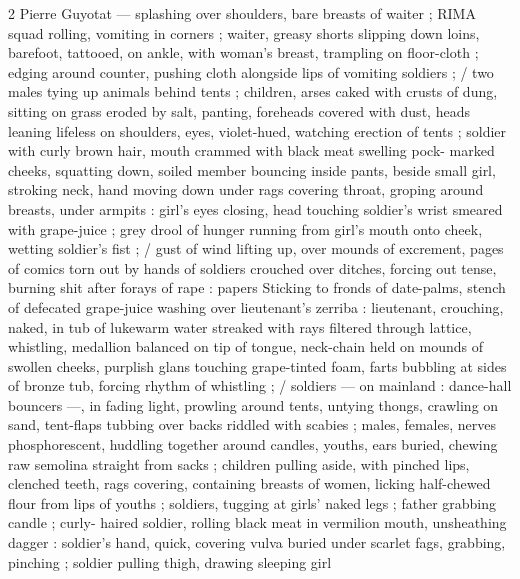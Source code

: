 2 Pierre Guyotat
— splashing over shoulders, bare breasts of waiter ; RIMA squad
rolling, vomiting in corners ; waiter, greasy shorts slipping down
loins, barefoot, tattooed, on ankle, with woman's breast, trampling
on floor-cloth ; edging around counter, pushing cloth alongside lips
of vomiting soldiers ; / two males tying up animals behind tents ;
children, arses caked with crusts of dung, sitting on grass eroded by
salt, panting, foreheads covered with dust, heads leaning lifeless on
shoulders, eyes, violet-hued, watching erection of tents ; soldier with
curly brown hair, mouth crammed with black meat swelling pock-
marked cheeks, squatting down, soiled member bouncing inside
pants, beside small girl, stroking neck, hand moving down under rags
covering throat, groping around breasts, under armpits : girl’s eyes
closing, head touching soldier's wrist smeared with grape-juice ; grey
drool of hunger running from girl's mouth onto cheek, wetting
soldier's fist ; / gust of wind lifting up, over mounds of excrement,
pages of comics torn out by hands of soldiers crouched over ditches,
forcing out tense, burning shit after forays of rape : papers Sticking
to fronds of date-palms, stench of defecated grape-juice washing
over lieutenant's zerriba : lieutenant, crouching, naked, in tub of
lukewarm water streaked with rays filtered through lattice, whistling,
medallion balanced on tip of tongue, neck-chain held on mounds of
swollen cheeks, purplish glans touching grape-tinted foam, farts
bubbling at sides of bronze tub, forcing rhythm of whistling ; /
soldiers — on mainland : dance-hall bouncers —, in fading light,
prowling around tents, untying thongs, crawling on sand, tent-flaps
tubbing over backs riddled with scabies ; males, females, nerves
phosphorescent, huddling together around candles, youths, ears
buried, chewing raw semolina straight from sacks ; children pulling
aside, with pinched lips, clenched teeth, rags covering, containing
breasts of women, licking half-chewed flour from lips of youths ;
soldiers, tugging at girls’ naked legs ; father grabbing candle ; curly-
haired soldier, rolling black meat in vermilion mouth, unsheathing
dagger : soldier's hand, quick, covering vulva buried under scarlet
fags, grabbing, pinching ; soldier pulling thigh, drawing sleeping girl

